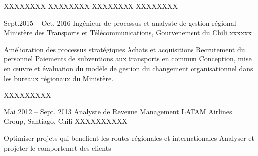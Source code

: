 \documentclass[30pt, french]{tccv}
\begin{document}
\begin{upshape}
\begin{experience}
    \setlength{\parskip}{-10pt}
    \begin{itemize}
      \setlength\itemsep{-3pt} 
      \cvitem[\checkmark] XXXXXXXX                         
      \cvitem[\checkmark] XXXXXXXX    
      \cvitem[\checkmark] XXXXXXXX                    
      \cvitem[\checkmark] XXXXXXXX                                           
    \end{itemize}     





\setlength{\parskip}{0pt}    
\item{Sept.2015 -- Oct. 2016 }     
  {Ingénieur de processus et analyste de gestion régional}     
  {Ministère des Transports et Télécommunications, Gourvenement du Chili}
     \fontsize{9pt}{1em}\color{text}\bodyfontlight\upshape\selectfont
%    
 xxxxxx\\

\setlength{\parskip}{-10pt}
\begin{itemize}
      \setlength\itemsep{-3pt} 
      \cvitem[\checkmark]  Amélioration des processus stratégiques                                        
      \cvitem[\checkmark]  Achats et acquisitions                                     
      \cvitem[\checkmark]  Recrutement du personnel
      \cvitem[\checkmark]  Paiements de subventions aux transports en commun
      \cvitem[\checkmark]  Conception, mise en œuvre et évaluation du modèle de gestion du changement organisationnel dans les bureaux régionaux du Ministère. 
     
     
\end{itemize}       
 XXXXXXXXX
\vspace{0.5cm}



\setlength{\parskip}{0pt}
\item{Mai 2012 -- Sept. 2013 }     
  {Analyste de Revenue Management }     
  {LATAM Airlines Group, Santiago, Chili}
\fontsize{9pt}{1em}\color{text}\bodyfontlight\upshape\selectfont
%
 XXXXXXXXXX \\
     
\setlength{\parskip}{-10pt}
\begin{itemize}
      \setlength\itemsep{-3pt} 
      \cvitem[\checkmark] Optimiser projets qui benefient les routes régionales et internationales         
      \cvitem[\checkmark] Analyser et projeter le comportemet des clients   
                                                                          

\end{itemize}
\end{experience}
\end{upshape}
\end{document}
